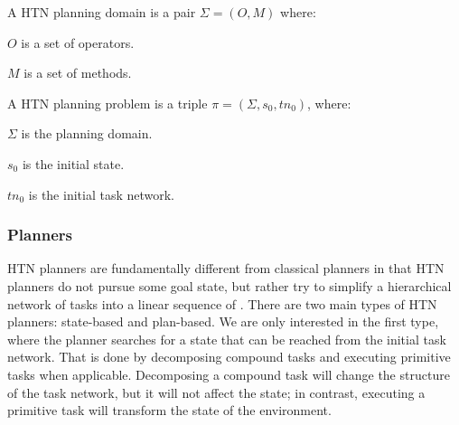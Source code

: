 \begin{Tdef}
    A  HTN planning domain is a pair $\Sigma= (O, M)$ where:
    \vspace{-0.5em}
    \begin{compactitem}
    \item 
    $O$ is a set of operators.
    \item 
    $M$ is a set of methods.
    \end{compactitem}
\end{Tdef}

\begin{Tdef}
    A HTN planning problem is a triple $\pi = (\Sigma,s_0,tn_0)$, where:
    \vspace{-0.5em}
    \begin{compactitem}
    \item 
    $\Sigma$ is the planning domain.
    \item 
    $s_0$ is the initial state.
    \item 
    $tn_0$ is the initial task network.
    \end{compactitem}
\end{Tdef}

\subsubsection{Planners}
HTN planners are fundamentally different from classical planners in that HTN planners do not pursue some goal state, but rather try to simplify a hierarchical network of tasks into a linear sequence of . There are two main types of HTN planners: state-based and plan-based. We are only interested in the first type, where the planner searches for a state that can be reached from the initial task network. That is done by decomposing compound tasks and executing primitive tasks when applicable. Decomposing a compound task will change the structure of the task network, but it will not affect the state; in contrast, executing a primitive task will transform the state of the environment.
